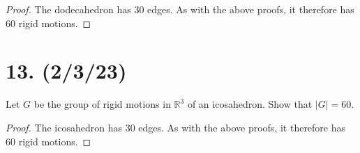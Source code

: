 \documentclass{article}
\begin{document}
\begin{proof}
    The dodecahedron has 30 edges. As with the above proofs, it therefore has 60 rigid motions.
\end{proof}

\section*{13. (2/3/23)}

Let $G$ be the group of rigid motions in $\mathbb{R}^3$ of an icosahedron. Show that $|G| = 60$.

\begin{proof}
    The icosahedron has 30 edges. As with the above proofs, it therefore has 60 rigid motions.
\end{proof}
\end{document}
